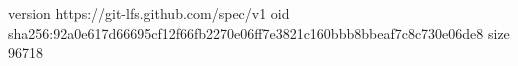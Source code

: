 version https://git-lfs.github.com/spec/v1
oid sha256:92a0e617d66695cf12f66fb2270e06ff7e3821c160bbb8bbeaf7c8c730e06de8
size 96718
